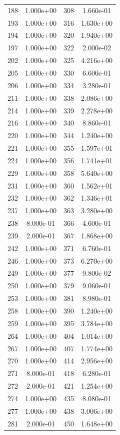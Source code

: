 \documentclass[12pt]{article}
\begin{document}
\begin{longtable}{@{}cccc@{}}
188 & 1.000e+00 & 308 & 1.660e-01 \\
193 & 1.000e+00 & 316 & 1.630e+00 \\
194 & 1.000e+00 & 320 & 1.940e+00 \\
197 & 1.000e+00 & 322 & 2.000e-02 \\
202 & 1.000e+00 & 325 & 4.216e+00 \\
205 & 1.000e+00 & 330 & 6.600e-01 \\
206 & 1.000e+00 & 334 & 3.280e-01 \\
211 & 1.000e+00 & 338 & 2.086e+00 \\
214 & 1.000e+00 & 339 & 2.278e+00 \\
216 & 1.000e+00 & 340 & 8.860e-01 \\
220 & 1.000e+00 & 344 & 1.240e+00 \\
221 & 1.000e+00 & 355 & 1.597e+01 \\
224 & 1.000e+00 & 356 & 1.741e+01 \\
229 & 1.000e+00 & 358 & 5.640e+00 \\
231 & 1.000e+00 & 360 & 1.562e+01 \\
232 & 1.000e+00 & 362 & 1.346e+01 \\
237 & 1.000e+00 & 363 & 3.280e+00 \\
238 & 8.000e-01 & 366 & 4.600e-01 \\
239 & 2.000e-01 & 367 & 1.868e+00 \\
242 & 1.000e+00 & 371 & 6.760e-01 \\
246 & 1.000e+00 & 373 & 6.270e+00 \\
249 & 1.000e+00 & 377 & 9.800e-02 \\
250 & 1.000e+00 & 379 & 9.060e-01 \\
253 & 1.000e+00 & 381 & 8.980e-01 \\
258 & 1.000e+00 & 390 & 1.240e+00 \\
259 & 1.000e+00 & 395 & 3.784e+00 \\
264 & 1.000e+00 & 404 & 1.014e+00 \\
267 & 1.000e+00 & 407 & 1.774e+00 \\
270 & 1.000e+00 & 414 & 2.956e+00 \\
271 & 8.000e-01 & 418 & 6.280e-01 \\
272 & 2.000e-01 & 421 & 1.254e+00 \\
274 & 1.000e+00 & 435 & 8.080e-01 \\
277 & 1.000e+00 & 438 & 3.006e+00 \\
281 & 2.000e-01 & 450 & 1.648e+00 \\

\end{longtable}
\end{document}
